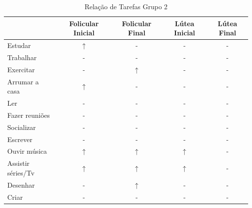     \begin{table}[]
        \centering
        \caption{Relação de Tarefas Grupo 2}
        \label{tab11}
        \begin{tabular}{|l|c|c|c|c|}
        \hline
        \rowcolor[HTML]{C0C0C0} 
        \multicolumn{1}{|c|}{\cellcolor[HTML]{C0C0C0}Tarefas recomendadas}  & Folicular Inicial & Folicular Final  & Lútea Inicial& Lútea Final \\ \hline
        Estudar & $\uparrow$  & -  & -  & -  \\ \hline
        \rowcolor[HTML]{EFEFEF} 
        Trabalhar & -  & -   & -  &  -   \\ \hline
        Exercitar & -  & $\uparrow$ & -  &  -  \\ \hline
        \rowcolor[HTML]{EFEFEF} 
        Arrumar a casa  & $\uparrow$ & -   & - & - \\ \hline
        Ler & - & -  & - & - \\ \hline
        \rowcolor[HTML]{EFEFEF} 
        Fazer reuniões & - & - & - & - \\ \hline
        \rowcolor[HTML]{EFEFEF} 
        Socializar & - & -  & - & - \\ \hline
        \rowcolor[HTML]{EFEFEF} 
        Escrever & - & -  & - & - \\ \hline
        Ouvir música & $\uparrow$ & $\uparrow$ & $\uparrow$ & - \\ \hline
        \rowcolor[HTML]{EFEFEF} 
        Assistir séries/Tv & $\uparrow$ & $\uparrow$ &$\uparrow$ & -\\ \hline
        Desenhar & - & $\uparrow$  & - & - \\ \hline
        \rowcolor[HTML]{EFEFEF} 
        Criar & - & -  & - & - \\ \hline
        \end{tabular}
        \end{table}



